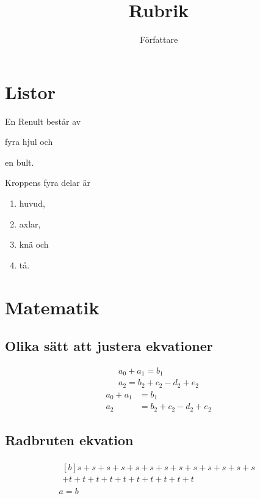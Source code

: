 \documentclass[a4paper, article, oneside]{memoir}
\title{Rubrik}
\author{Författare}
\begin{document}
\maketitle

\chapter{Listor}

En Renult består av
\begin{enumerate*}[label=(\alph*)]
\item fyra hjul och
\item en bult.
\end{enumerate*}
Kroppens fyra delar är
\begin{enumerate}
\item huvud,
\item axlar,
\item knä och
\item tå.
\end{enumerate}

\chapter{Matematik}

\section{Olika sätt att justera ekvationer}
\begin{gather}
a_0+a_1=b_1\\
a_2=b_2+c_2-d_2+e_2
\end{gather}
\begin{align}
a_0+a_1&=b_1\\
a_2&=b_2+c_2-d_2+e_2
\end{align}
\section{Radbruten ekvation}
\begin{gather}
\begin{multlined}[b]
s+s+s+s+s+s+s+s+s+s+s+s+s\\
+t+t+t+t+t+t+t+t+t+t
\end{multlined}\\
a=b
\end{gather}
\end{document}

